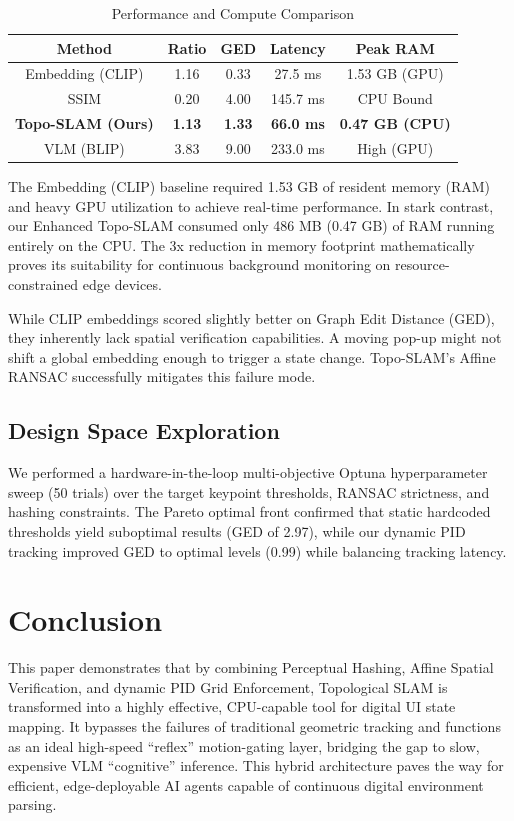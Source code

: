 \documentclass[journal]{IEEEtran}
\begin{document}
\begin{table}[htbp]
\caption{Performance and Compute Comparison}
\label{tab:results}
\centering
\begin{tabular}{|c|c|c|c|c|}
\hline
\textbf{Method} & \textbf{Ratio} & \textbf{GED} & \textbf{Latency} & \textbf{Peak RAM} \\
\hline
Embedding (CLIP) & 1.16 & 0.33 & 27.5 ms & 1.53 GB (GPU) \\
SSIM & 0.20 & 4.00 & 145.7 ms & CPU Bound \\
\textbf{Topo-SLAM (Ours)} & \textbf{1.13} & \textbf{1.33} & \textbf{66.0 ms} & \textbf{0.47 GB (CPU)} \\
VLM (BLIP) & 3.83 & 9.00 & 233.0 ms & High (GPU) \\
\hline
\end{tabular}
\end{table}

The Embedding (CLIP) baseline required 1.53 GB of resident memory (RAM) and heavy GPU utilization to achieve real-time performance. In stark contrast, our Enhanced Topo-SLAM consumed only 486 MB (0.47 GB) of RAM running entirely on the CPU. The 3x reduction in memory footprint mathematically proves its suitability for continuous background monitoring on resource-constrained edge devices.

While CLIP embeddings scored slightly better on Graph Edit Distance (GED), they inherently lack spatial verification capabilities. A moving pop-up might not shift a global embedding enough to trigger a state change. Topo-SLAM's Affine RANSAC successfully mitigates this failure mode.

\subsection{Design Space Exploration}
We performed a hardware-in-the-loop multi-objective Optuna hyperparameter sweep (50 trials) over the target keypoint thresholds, RANSAC strictness, and hashing constraints. The Pareto optimal front confirmed that static hardcoded thresholds yield suboptimal results (GED of 2.97), while our dynamic PID tracking improved GED to optimal levels (0.99) while balancing tracking latency.

\section{Conclusion}
This paper demonstrates that by combining Perceptual Hashing, Affine Spatial Verification, and dynamic PID Grid Enforcement, Topological SLAM is transformed into a highly effective, CPU-capable tool for digital UI state mapping. It bypasses the failures of traditional geometric tracking and functions as an ideal high-speed ``reflex'' motion-gating layer, bridging the gap to slow, expensive VLM ``cognitive'' inference. This hybrid architecture paves the way for efficient, edge-deployable AI agents capable of continuous digital environment parsing.
\end{document}
